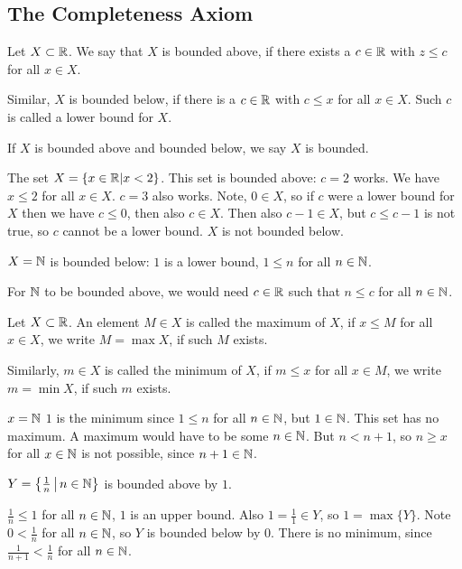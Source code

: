 \documentclass[10pt, a4paper]{article}
\begin{document}
\subsection{The Completeness Axiom}
\begin{definition}
    Let $X \subset \mathbb{R}$. We say that $X$ is bounded above, if there exists a $c \in \mathbb{R}$ with $z \leq c$ for all $x \in X$.
    
    Similar, $X$ is bounded below, if there is a $c \in \mathbb{R}$ with $c \leq x$ for all $x \in X$. Such $c$ is called a lower bound for $X$.
    
    If $X$ is bounded above and bounded below, we say $X$ is bounded.
\end{definition}

\begin{example}
    The set $X = \{x \in \mathbb{R} | x < 2\}$. This set is bounded above: $c = 2$ works. We have $x \leq 2$ for all $x \in X$. $c = 3$ also works. Note, $0 \in X$, so if $c$ were a lower bound for $X$ then we have $c \leq 0$, then also $c \in X$. Then also $c - 1 \in X$, but $c \leq c - 1$ is not true, so $c$ cannot be a lower bound. $X$ is not bounded below.
\end{example}

\begin{example}
    $X = \mathbb{N}$ is bounded below: $1$ is a lower bound, $1 \leq n$ for all $n \in \mathbb{N}$.

    For $\mathbb{N}$ to be bounded above, we would need $c \in \mathbb{R}$ such that $n \leq c$ for all $n \in \mathbb{N}$.
\end{example}

\begin{definition}
    Let $X \subset \mathbb{R}$. An element $M \in X$ is called the maximum of $X$, if $x \leq M$ for all $x \in X$, we write $M = \max X$, if such $M$ exists.

    Similarly, $m \in X$ is called the minimum of $X$, if $m \leq x$ for all $x \in M$, we write $m = \min X$, if such $m$ exists.
\end{definition}

\begin{example}\label{examp_analy_1}
    $x = \mathbb{N}$ $1$ is the minimum since $1 \leq n$ for all $n \in \mathbb{N}$, but $1 \in \mathbb{N}$. This set has no maximum. A maximum would have to be some $n \in \mathbb{N}$. But $n < n + 1$, so $n \geq x$ for all $x \in \mathbb{N}$ is not possible, since $n + 1 \in \mathbb{N}$.
\end{example}

\begin{example}
    $Y = \left\{\frac{1}{n} \,\middle|\, n \in \mathbb{N}\right\}$ is bounded above by $1$.
    
    $\frac{1}{n} \leq1$ for all $n \in \mathbb{N}$, $1$ is an upper bound.
    Also $1 = \frac{1}{1} \in Y$, so $1 = \max\{Y\}$.
    Note $0 < \frac{1}{n}$ for all $n \in \mathbb{N}$, so $Y$ is bounded below by $0$.
    There is no minimum,
    since $\frac{1}{n + 1} < \frac{1}{n}$ for all $n \in \mathbb{N}$.
\end{example}
\end{document}
